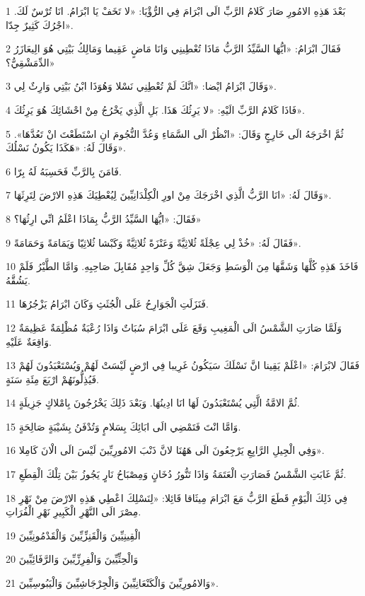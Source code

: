 \par 1 بَعْدَ هَذِهِ الامُورِ صَارَ كَلامُ الرَّبِّ الَى ابْرَامَ فِي الرُّؤْيَا: «لا تَخَفْ يَا ابْرَامُ. انَا تُرْسٌ لَكَ. اجْرُكَ كَثِيرٌ جِدّا».
\par 2 فَقَالَ ابْرَامُ: «ايُّهَا السَّيِّدُ الرَّبُّ مَاذَا تُعْطِينِي وَانَا مَاضٍ عَقِيما وَمَالِكُ بَيْتِي هُوَ الِيعَازَرُ الدِّمَشْقِيُّ؟»
\par 3 وَقَالَ ابْرَامُ ايْضا: «انَّكَ لَمْ تُعْطِنِي نَسْلا وَهُوَذَا ابْنُ بَيْتِي وَارِثٌ لِي».
\par 4 فَاذَا كَلامُ الرَّبِّ الَيْهِ: «لا يَرِثُكَ هَذَا. بَلِ الَّذِي يَخْرُجُ مِنْ احْشَائِكَ هُوَ يَرِثُكَ».
\par 5 ثُمَّ اخْرَجَهُ الَى خَارِجٍ وَقَالَ: «انْظُرْ الَى السَّمَاءِ وَعُدَّ النُّجُومَ انِ اسْتَطَعْتَ انْ تَعُدَّهَا». وَقَالَ لَهُ: «هَكَذَا يَكُونُ نَسْلُكَ».
\par 6 فَامَنَ بِالرَّبِّ فَحَسِبَهُ لَهُ بِرّا.
\par 7 وَقَالَ لَهُ: «انَا الرَّبُّ الَّذِي اخْرَجَكَ مِنْ اورِ الْكِلْدَانِيِّينَ لِيُعْطِيَكَ هَذِهِ الارْضَ لِتَرِثَهَا».
\par 8 فَقَالَ: «ايُّهَا السَّيِّدُ الرَّبُّ بِمَاذَا اعْلَمُ انِّي ارِثُهَا؟»
\par 9 فَقَالَ لَهُ: «خُذْ لِي عِجْلَةً ثُلاثِيَّةً وَعَنْزَةً ثُلاثِيَّةً وَكَبْشا ثُلاثِيّا وَيَمَامَةً وَحَمَامَةً».
\par 10 فَاخَذَ هَذِهِ كُلَّهَا وَشَقَّهَا مِنَ الْوَسَطِ وَجَعَلَ شِقَّ كُلِّ وَاحِدٍ مُقَابِلَ صَاحِبِهِ. وَامَّا الطَّيْرُ فَلَمْ يَشُقَّهُ.
\par 11 فَنَزَلَتِ الْجَوَارِحُ عَلَى الْجُثَثِ وَكَانَ ابْرَامُ يَزْجُرُهَا.
\par 12 وَلَمَّا صَارَتِ الشَّمْسُ الَى الْمَغِيبِ وَقَعَ عَلَى ابْرَامَ سُبَاتٌ وَاذَا رُعْبَةٌ مُظْلِمَةٌ عَظِيمَةٌ وَاقِعَةٌ عَلَيْهِ.
\par 13 فَقَالَ لابْرَامَ: «اعْلَمْ يَقِينا انَّ نَسْلَكَ سَيَكُونُ غَرِيبا فِي ارْضٍ لَيْسَتْ لَهُمْ وَيُسْتَعْبَدُونَ لَهُمْ فَيُذِلُّونَهُمْ ارْبَعَ مِئَةِ سَنَةٍ.
\par 14 ثُمَّ الامَّةُ الَّتِي يُسْتَعْبَدُونَ لَهَا انَا ادِينُهَا. وَبَعْدَ ذَلِكَ يَخْرُجُونَ بِامْلاكٍ جَزِيلَةٍ.
\par 15 وَامَّا انْتَ فَتَمْضِي الَى ابَائِكَ بِسَلامٍ وَتُدْفَنُ بِشَيْبَةٍ صَالِحَةٍ.
\par 16 وَفِي الْجِيلِ الرَّابِعِ يَرْجِعُونَ الَى هَهُنَا لانَّ ذَنْبَ الامُورِيِّينَ لَيْسَ الَى الْانَ كَامِلا».
\par 17 ثُمَّ غَابَتِ الشَّمْسُ فَصَارَتِ الْعَتَمَةُ وَاذَا تَنُّورُ دُخَانٍ وَمِصْبَاحُ نَارٍ يَجُوزُ بَيْنَ تِلْكَ الْقِطَعِ.
\par 18 فِي ذَلِكَ الْيَوْمِ قَطَعَ الرَّبُّ مَعَ ابْرَامَ مِيثَاقا قَائِلا: «لِنَسْلِكَ اعْطِي هَذِهِ الارْضَ مِنْ نَهْرِ مِصْرَ الَى النَّهْرِ الْكَبِيرِ نَهْرِ الْفُرَاتِ.
\par 19 الْقِينِيِّينَ وَالْقَنِزِّيِّينَ وَالْقَدْمُونِيِّينَ
\par 20 وَالْحِثِّيِّينَ وَالْفِرِزِّيِّينَ وَالرَّفَائِيِّينَ
\par 21 وَالامُورِيِّينَ وَالْكَنْعَانِيِّينَ وَالْجِرْجَاشِيِّينَ وَالْيَبُوسِيِّينَ».

